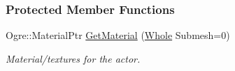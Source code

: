 \subsubsection*{Protected Member Functions}
\begin{DoxyCompactItemize}
\item 
\hypertarget{classMezzanine_1_1ActorGraphicsSettings_a984742dd8086b333772fc6385f5433f6}{
Ogre::MaterialPtr \hyperlink{classMezzanine_1_1ActorGraphicsSettings_a984742dd8086b333772fc6385f5433f6}{GetMaterial} (\hyperlink{namespaceMezzanine_adcbb6ce6d1eb4379d109e51171e2e493}{Whole} Submesh=0)}
\label{classMezzanine_1_1ActorGraphicsSettings_a984742dd8086b333772fc6385f5433f6}

\begin{DoxyCompactList}\small\item\em Material/textures for the actor. \item\end{DoxyCompactList}\end{DoxyCompactItemize}

